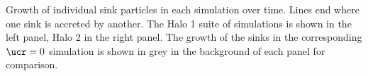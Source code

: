 \label{fig:sinks} Growth of individual sink particles in each simulation over time. 
Lines end where one sink is accreted by another. 
The Halo 1 suite of simulations is shown in the left panel, Halo 2 in the right panel.  
The growth of the sinks in the corresponding $\ucr=0$ simulation is shown in grey in the background of each panel for comparison.